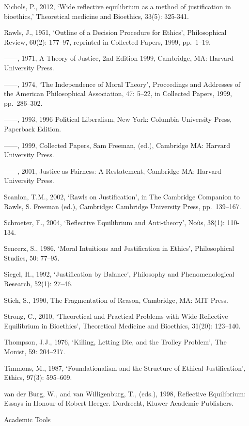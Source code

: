 \documentclass[]{article}
\begin{document}
Nichols, P., 2012, `Wide reflective equilibrium as a method of
justification in bioethics,' Theoretical medicine and Bioethics, 33(5):
325-341.

Rawls, J., 1951, `Outline of a Decision Procedure for Ethics',
Philosophical Review, 60(2): 177--97, reprinted in Collected Papers,
1999, pp.~1--19.

------, 1971, A Theory of Justice, 2nd Edition 1999, Cambridge, MA:
Harvard University Press.

------, 1974, `The Independence of Moral Theory', Proceedings and
Addresses of the American Philosophical Association, 47: 5--22, in
Collected Papers, 1999, pp.~286--302.

------, 1993, 1996 Political Liberalism, New York: Columbia University
Press, Paperback Edition.

------, 1999, Collected Papers, Sam Freeman, (ed.), Cambridge MA:
Harvard University Press.

------, 2001, Justice as Fairness: A Restatement, Cambridge MA: Harvard
University Press.

Scanlon, T.M., 2002, `Rawls on Justification', in The Cambridge
Companion to Rawls, S. Freeman (ed.), Cambridge: Cambridge University
Press, pp.~139--167.

Schroeter, F., 2004, `Reflective Equilibrium and Anti-theory', Noûs,
38(1): 110-134.

Sencerz, S., 1986, `Moral Intuitions and Justification in Ethics',
Philosophical Studies, 50: 77--95.

Siegel, H., 1992, `Justification by Balance', Philosophy and
Phenomenological Research, 52(1): 27--46.

Stich, S., 1990, The Fragmentation of Reason, Cambridge, MA: MIT Press.

Strong, C., 2010, `Theoretical and Practical Problems with Wide
Reflective Equilibrium in Bioethics', Theoretical Medicine and
Bioethics, 31(20): 123--140.

Thompson, J.J., 1976, `Killing, Letting Die, and the Trolley Problem',
The Monist, 59: 204--217.

Timmons, M., 1987, `Foundationalism and the Structure of Ethical
Justification', Ethics, 97(3): 595--609.

van der Burg, W., and van Willigenburg, T., (eds.), 1998, Reflective
Equilibrium: Essays in Honour of Robert Heeger. Dordrecht, Kluwer
Academic Publishers.

\hypertarget{academic-tools}{}
\protect\hypertarget{Aca}{}{Academic Tools}
\end{document}
